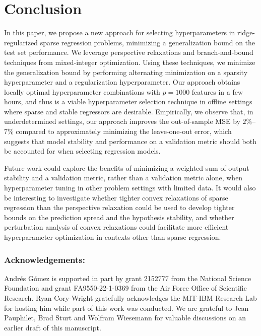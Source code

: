 \documentclass[mnsc,nonblindrev]{informs3} %
\let\enotesize=\normalsize
\begin{document}
\section{Conclusion}
In this paper, we propose a new approach 
for selecting hyperparameters in ridge-regularized sparse regression problems, minimizing a generalization bound on the test set performance. We leverage perspective relaxations and branch-and-bound techniques from mixed-integer optimization. Using these techniques, we minimize the generalization bound by performing alternating minimization on a sparsity hyperparameter and a regularization hyperparameter. Our approach obtains locally optimal hyperparameter combinations with $p=1000$ features in a few hours, and thus is a viable hyperparameter selection technique in offline settings where sparse and stable regressors are desirable. Empirically, we observe that, in underdetermined settings, our approach improves the out-of-sample MSE by $2\%$--$7\%$ compared to approximately minimizing the leave-one-out error, which suggests that model stability and performance on a validation metric should both be accounted for when selecting regression models.

Future work could explore the benefits of minimizing a weighted sum of output stability and a validation metric, rather than a validation metric alone, when hyperparameter tuning in other problem settings with limited data. %
It would also be interesting to investigate whether tighter convex relaxations of sparse regression than the perspective relaxation could be used to develop tighter bounds on the prediction spread and the hypothesis stability, and whether perturbation analysis of convex relaxations could facilitate more efficient hyperparameter optimization in contexts other than sparse regression.

 \subsubsection*{Acknowledgements: }%
 Andr\'es G\'omez is supported in part by grant 2152777 from the National Science Foundation and grant FA9550-22-1-0369 from the Air Force Office of Scientific Research. Ryan Cory-Wright gratefully acknowledges the MIT-IBM Research Lab for hosting him while part of this work was conducted. We are grateful to Jean Pauphilet, Brad Sturt and Wolfram Wiesemann for valuable discussions on an earlier draft of this manuscript.
{\def\enotesize{\footnotesize}

\theendnotes
}
\end{document}
